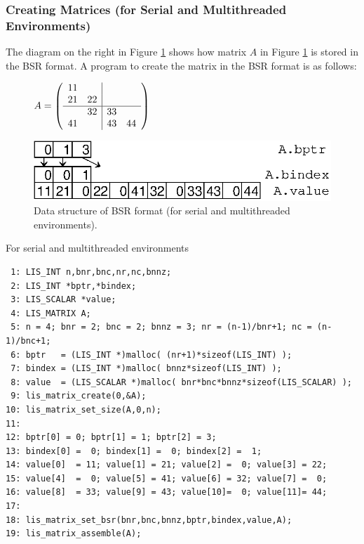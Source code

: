 \documentclass[a4paper]{article}
\begin{document}
\subsubsection{Creating Matrices (for Serial and Multithreaded Environments)}
The diagram on the right in Figure \ref{fig:storage07} shows how matrix $A$ in Figure \ref{fig:storage07} is stored in the BSR format. A program to create the matrix in the BSR format is as follows:
\begin{figure}[h]
{\centering 
\begin{minipage}{0.3\textwidth}
\begin{flushright}
$ 
A = \left(
\begin{array}{cc|cc}
11 &    &    &    \\
21 & 22 &    &    \\ \hline
   & 32 & 33 &    \\
41 &    & 43 & 44 \\
\end{array}\right)
$
\end{flushright}
\end{minipage}
\begin{minipage}{0.6\textwidth}
\begin{flushleft}
\includegraphics{storage07.eps} 
\end{flushleft}
\end{minipage}
\caption{Data structure of BSR format (for serial and multithreaded environments).}\label{fig:storage07}}
\end{figure}
\begin{itemsquarebox}[l]{For serial and multithreaded environments}
\small
\begin{verbatim}
 1: LIS_INT n,bnr,bnc,nr,nc,bnnz;
 2: LIS_INT *bptr,*bindex;
 3: LIS_SCALAR *value;
 4: LIS_MATRIX A;
 5: n = 4; bnr = 2; bnc = 2; bnnz = 3; nr = (n-1)/bnr+1; nc = (n-1)/bnc+1;
 6: bptr   = (LIS_INT *)malloc( (nr+1)*sizeof(LIS_INT) );
 7: bindex = (LIS_INT *)malloc( bnnz*sizeof(LIS_INT) );
 8: value  = (LIS_SCALAR *)malloc( bnr*bnc*bnnz*sizeof(LIS_SCALAR) );
 9: lis_matrix_create(0,&A);
10: lis_matrix_set_size(A,0,n);
11:
12: bptr[0] = 0; bptr[1] = 1; bptr[2] = 3;
13: bindex[0] =  0; bindex[1] =  0; bindex[2] =  1;
14: value[0]  = 11; value[1] = 21; value[2] =  0; value[3] = 22;
15: value[4]  =  0; value[5] = 41; value[6] = 32; value[7] =  0;
16: value[8]  = 33; value[9] = 43; value[10]=  0; value[11]= 44;
17:
18: lis_matrix_set_bsr(bnr,bnc,bnnz,bptr,bindex,value,A);
19: lis_matrix_assemble(A);
\end{verbatim}
\end{itemsquarebox}
\end{document}

